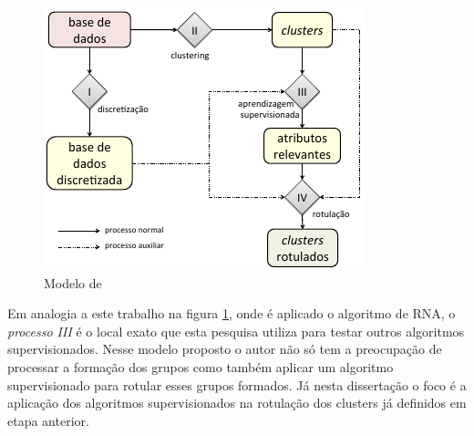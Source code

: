 \begin{figure}[h]
        \centering
        \includegraphics[scale=0.8]{figs/modeloLopes.png}
        \caption{Modelo de \cite{Lopes2016}} 
        \label{fig:modeloLOPES}
\end{figure}

Em analogia a este trabalho na figura \ref{fig:modeloLOPES}, onde é aplicado o algoritmo  de RNA, o \textit{processo III} é o local exato que esta pesquisa utiliza para testar outros algoritmos supervisionados. Nesse modelo proposto o autor não só tem a preocupação de processar  a formação dos grupos como também aplicar um algoritmo supervisionado para rotular esses grupos formados. Já nesta dissertação o foco é a aplicação dos algoritmos supervisionados na rotulação dos clusters já definidos em etapa anterior.



